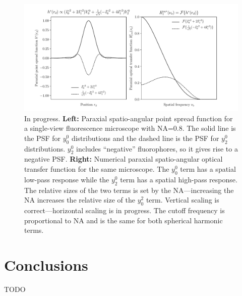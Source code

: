 \documentclass[11pt]{article}
\begin{document}
\begin{figure}[h]
 \captionsetup{width=1.0\linewidth}
 \centering
   \centering
   \includegraphics[width = 1.\textwidth]{../calculations/ft.pdf}
   \caption{In progress. \textbf{Left:} Paraxial spatio-angular point spread
     function for a single-view fluorescence microscope with NA=0.8. The solid
     line is the PSF for $y_0^0$ distributions and the dashed line is the PSF
     for $y_2^0$ distributions. $y_2^0$ includes ``negative'' fluorophores, so
     it gives rise to a negative PSF. \textbf{Right:} Numerical paraxial
     spatio-angular optical transfer function for the same microscope. The
     $y_0^0$ term has a spatial low-pass response while the $y_2^0$ term has a
     spatial high-pass response. The relative sizes of the two terms is set by
     the NA---increasing the NA increases the relative size of the $y_0^2$ term.
     Vertical scaling is correct---horizontal scaling is in progress. The cutoff
     frequency is proportional to NA and is the same for both spherical harmonic
     terms.}
   \label{fig:para}
\end{figure}
    
\section{Conclusions}

TODO 

{}


\appendix
\end{document}
